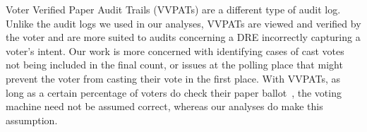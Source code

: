 \begin{comment}
A common problem on election day, which we try to identify in our analysis, is the occurrence of long lines. Many studies have researched ways to mitigate long lines at polling locations ~\cite{Allen2006,Dow2007,Spencer2010,Wilson2008,Edel2010}.  One such study has simulated the flow of voters through the voting process~\cite{Edel2010}. The authors use this simulation to determine the optimal number of voters per voting machine, and correspondingly, the appropriate number of voting machines per polling location based on the number of registered voters at that particular location. Their work is predictive: the authors make some assumptions, such as the average time it takes to vote and when peak voting hours will occur, and use those as a basis for predicting where long lines are likely to occur. Our analysis is descriptive: given the audit logs from election day, we infer the average time it took to vote and use that information to determine whether a particular polling location experienced long lines or not. The two methods are complementary. Predictive models can be used to prevent long lines, while descriptive models can be used to check and refine the prediction algorithms. 
\end{comment}

Voter Verified Paper Audit Trails (VVPATs) are a different type of audit log. Unlike the audit logs we used in our analyses, VVPATs are viewed and verified by the voter and are more suited to audits concerning a DRE incorrectly capturing a voter\textquoteright s intent. Our work is more concerned with identifying cases of cast votes not being included in the final count, or issues at the polling place that might prevent the voter from casting their vote in the first place. With VVPATs, as long as a certain percentage of voters do check their paper ballot~\cite{Hall2006}, the voting machine need not be assumed correct, whereas our analyses do make this assumption.

